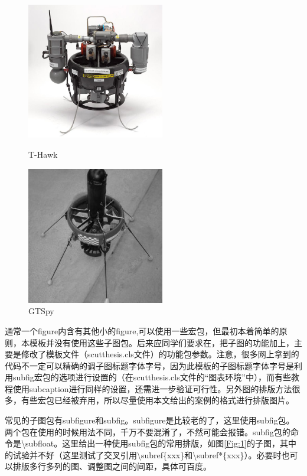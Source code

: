 \begin{figure}[htbp]
	\centering
	\begin{minipage}[c]{0.5\textwidth}
		\centering
		\includegraphics[width=6cm,height=6cm]{Fig/honeywell_t-hawk.jpg}
		\caption{\label{Hawk}T-Hawk}
	\end{minipage}%
	\begin{minipage}[c]{0.5\textwidth}
		\centering
		\includegraphics[width=6cm,height=6cm]{Fig/GTSpy.jpg}
		\caption{\label{GTSpy}GTSpy}
	\end{minipage}
\end{figure}


通常一个figure内含有其他小的figure,可以使用一些宏包，但最初本着简单的原则，本模板并没有使用这些子图包。后来应同学们要求在，把子图的功能加上，主要是修改了模板文件（scutthesis.cls文件）的功能包参数。注意，很多网上拿到的代码不一定可以精确的调子图标题字体字号，因为此模板的子图标题字体字号是利用subfig宏包的选项进行设置的（在scutthesis.cls文件的“图表环境”中），而有些教程使用subcaption进行同样的设置，还需进一步验证可行性。另外图的排版方法很多，有些宏包已经被弃用，所以尽量使用本文给出的案例的格式进行排版图片。

常见的子图包有subfigure和subfig。subfigure是比较老的了，这里使用subfig包。两个包在使用的时候用法不同，千万不要混淆了，不然可能会报错。subfig包的命令是\textbackslash{}subfloat。这里给出一种使用subfig包的常用排版，如图\ref{Fig:1}的子图，其中的试验并不好（这里测试了交叉引用\textbackslash{}subref\{xxx\}和\textbackslash{}subref*\{xxx\}）。必要时也可以排版多行多列的图、调整图之间的间距，具体可百度。

